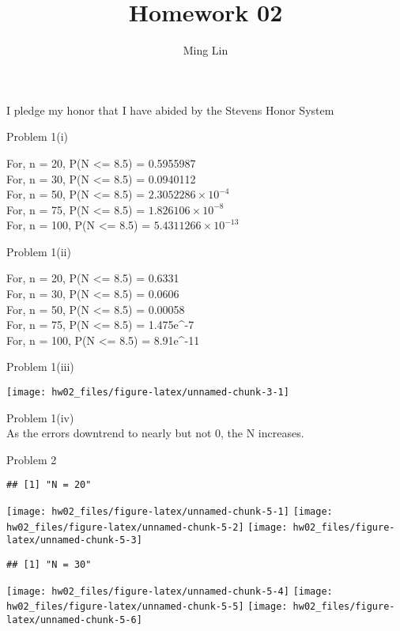 \documentclass[
]{article}
\title{Homework 02}
\author{Ming Lin}
\date{}
\begin{document}
\maketitle

I pledge my honor that I have abided by the Stevens Honor System

Problem 1(i)

For, n = 20, P(N \textless= 8.5) = 0.5955987\\
For, n = 30, P(N \textless= 8.5) = 0.0940112\\
For, n = 50, P(N \textless= 8.5) =
\ensuremath{2.3052286\times 10^{-4}}\\
For, n = 75, P(N \textless= 8.5) = \ensuremath{1.826106\times 10^{-8}}\\
For, n = 100, P(N \textless= 8.5) =
\ensuremath{5.4311266\times 10^{-13}}

Problem 1(ii)

For, n = 20, P(N \textless= 8.5) = 0.6331\\
For, n = 30, P(N \textless= 8.5) = 0.0606\\
For, n = 50, P(N \textless= 8.5) = 0.00058\\
For, n = 75, P(N \textless= 8.5) = 1.475e\^{}-7 ~\\
For, n = 100, P(N \textless= 8.5) = 8.91e\^{}-11

Problem 1(iii)

\begin{flushleft}\texttt{[image: hw02\_files/figure-latex/unnamed-chunk-3-1]} \end{flushleft}

Problem 1(iv)\\
As the errors downtrend to nearly but not 0, the N increases.

Problem 2

\begin{verbatim}
## [1] "N = 20"
\end{verbatim}

\texttt{[image: hw02\_files/figure-latex/unnamed-chunk-5-1]}
\texttt{[image: hw02\_files/figure-latex/unnamed-chunk-5-2]}
\texttt{[image: hw02\_files/figure-latex/unnamed-chunk-5-3]}

\begin{verbatim}
## [1] "N = 30"
\end{verbatim}

\texttt{[image: hw02\_files/figure-latex/unnamed-chunk-5-4]}
\texttt{[image: hw02\_files/figure-latex/unnamed-chunk-5-5]}
\texttt{[image: hw02\_files/figure-latex/unnamed-chunk-5-6]}
\end{document}
